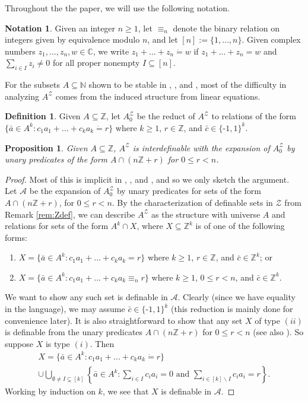 \documentclass{amsart}
\def\seq{\subseteq}
\newcommand{\nv}{\text{-}}
\newcommand{\abar}{\bar{a}}
\newcommand{\cbar}{\bar{c}}
\newcommand{\de}{\mathbin{\dot{=}}}
\newcommand{\cA}{\mathcal{A}}
\newcommand{\cZ}{\mathcal{Z}}
\def\C{\mathbb C}
\def\N{\mathbb N}
\def\Z{\mathbb Z}
\newtheorem{proposition}[theorem]{Proposition}
\theoremstyle{definition}
\newtheorem{definition}[theorem]{Definition}
\newtheorem{notation}[theorem]{Notation}
\begin{document}
Throughout the  the paper, we will use the following notation.

\begin{notation}
Given an integer $n\geq 1$, let $\equiv_n$ denote the binary relation on integers given by equivalence modulo $n$, and let $[n]:=\{1,\ldots,n\}$. Given complex numbers  $z_1,\ldots,z_n,w\in\C$, we write $z_1+\ldots+z_n\de w$ if $z_1+\ldots+z_n=w$ and $\sum_{i\in I}z_i\neq 0$ for all proper nonempty $I\seq[n]$.  
\end{notation}



For the subsets $A\seq\N$ shown to be stable in \cite{CoSS}, \cite{PoLa}, and \cite{PaSk}, most of the difficulty in analyzing $A^{\cZ}$ comes from the induced structure from linear equations. 

\begin{definition}
Given $A\seq\Z$, let $A^{\cZ}_0$ be the reduct of $A^{\cZ}$ to relations of the form $\{\abar\in A^k: c_1a_1+\ldots+c_ka_k\de r\}$ where $k\geq 1$, $r\in\Z$, and $\cbar\in\{\nv 1,1\}^k$. 
\end{definition}


\begin{proposition}\label{prop:cong}
Given $A\seq\Z$, $A^{\cZ}$ is interdefinable with the expansion of $A^{\cZ}_0$ by unary predicates of the form $A\cap(n\Z+r)$ for $0\leq r<n$.
\end{proposition}
\begin{proof}
Most of this is implicit in \cite{PaSk}, \cite{PoLa}, and \cite{CoSS}, and so we only sketch the argument. Let $\cA$ be the expansion of $A^{\cZ}_0$ by unary predicates for sets of the form $A\cap (n\Z+r)$, for $0\leq r<n$. By the characterization of definable sets in $\cZ$ from Remark \ref{rem:Zdef}, we can describe $A^{\cZ}$ as the structure with universe $A$ and relations for sets of the form $A^k\cap X$, where $X\seq\Z^k$ is of one of the following forms:
\begin{enumerate}[$(i)$]
\item $X=\{\abar\in A^k:c_1a_1+\ldots+c_ka_k=r\}$ where $k\geq 1$, $r\in\Z$, and $\cbar\in\Z^k$; or
\item $X=\{\abar\in A^k:c_1a_1+\ldots+c_ka_k\equiv_n r\}$ where $k\geq 1$, $0\leq r<n$, and $\cbar\in\Z^k$.
\end{enumerate}
We want to show any such set is definable in $\cA$. Clearly (since we have equality in the language), we may assume $\cbar\in\{\nv 1,1\}^k$ (this reduction is mainly done for convenience later). It is also straightforward to show that any set $X$ of type $(ii)$ is definable from the unary predicates $A\cap (n\Z+r)$ for $0\leq r<n$ (see also \cite[Proposition 5.2]{CoSS}). So suppose $X$ is type $(i)$. Then 
\begin{multline*}
X=\{\abar\in A^k:c_1a_1+\ldots+c_ka_k\de r\}\\
\cup\bigcup_{\emptyset\neq I\subsetneq [k]}\left\{\abar\in A^k:\sum_{i\in I}c_ia_i=0\text{ and } \sum_{i\in [k]\backslash I} c_ia_i=r\right\}.
\end{multline*}
Working by induction on $k$, we see that $X$ is definable in $\cA$.
\end{proof}
\end{document}
